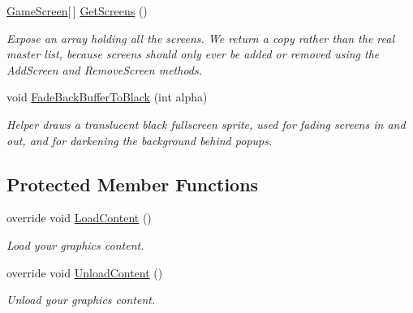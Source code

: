 \begin{DoxyCompactItemize}
\hyperlink{classCityMania_1_1GameScreen}{GameScreen}\mbox{[}$\,$\mbox{]} \hyperlink{classCityMania_1_1TEMP_1_1ScreenManager_a5592ebdeeb6968d4b45faf7fa905c9a8}{GetScreens} ()
\begin{DoxyCompactList}\small\item\em Expose an array holding all the screens. We return a copy rather than the real master list, because screens should only ever be added or removed using the AddScreen and RemoveScreen methods. \item\end{DoxyCompactList}\item 
void \hyperlink{classCityMania_1_1TEMP_1_1ScreenManager_abd1ee6fbaabfdb5a8363c4df60550aa4}{FadeBackBufferToBlack} (int alpha)
\begin{DoxyCompactList}\small\item\em Helper draws a translucent black fullscreen sprite, used for fading screens in and out, and for darkening the background behind popups. \item\end{DoxyCompactList}\end{DoxyCompactItemize}
\subsection*{Protected Member Functions}
\begin{DoxyCompactItemize}
\item 
override void \hyperlink{classCityMania_1_1TEMP_1_1ScreenManager_a0adf33efb7ec6a3aece591d7dc8d01b4}{LoadContent} ()
\begin{DoxyCompactList}\small\item\em Load your graphics content. \item\end{DoxyCompactList}\item 
override void \hyperlink{classCityMania_1_1TEMP_1_1ScreenManager_a6054a8c276fd02a31500a0d2ecf05da2}{UnloadContent} ()
\begin{DoxyCompactList}\small\item\em Unload your graphics content. \item\end{DoxyCompactList}\end{DoxyCompactItemize}
